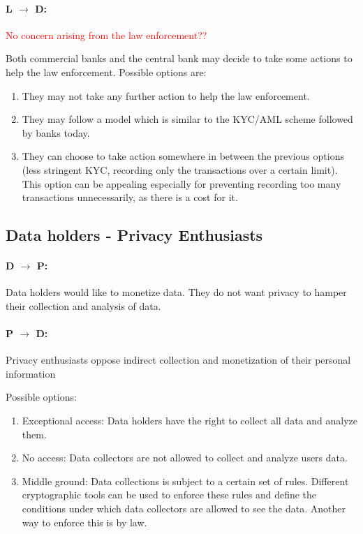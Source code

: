 \documentclass[runningheads]{llncs}
\begin{document}
\paragraph{L $\rightarrow$ D:} \textcolor{red}{No concern arising from the law enforcement??}

Both commercial banks and the central bank may decide to take some actions to help the law enforcement. Possible options are:
\begin{enumerate}
	\item They may not take any further action to help the law enforcement.
	\item They may follow a model which is similar to the KYC/AML scheme followed by banks today.
	\item They can choose to take action somewhere in between the previous options (\eg less stringent KYC, recording only the transactions over a certain limit). This option can be appealing especially for preventing recording too many transactions unnecessarily, as there is a cost for it.
\end{enumerate}

\subsection{Data holders - Privacy Enthusiasts}
\paragraph{D $\rightarrow$ P:} Data holders would like to monetize data. They do not want privacy to hamper their collection and analysis of data. 
\paragraph{P $\rightarrow$ D:} Privacy enthusiasts oppose indirect collection and monetization of their personal information


Possible options:
\begin{enumerate}
	\item Exceptional access: Data holders have the right to collect all data and analyze them.
	\item No access: Data collectors are not allowed to collect and analyze users data.
	\item Middle ground: Data collections is subject to a certain set of rules. Different cryptographic tools can be used to enforce these rules and define the conditions under which data collectors are allowed to see the data. Another way to enforce this is by law. 
\end{enumerate}
\end{document}
